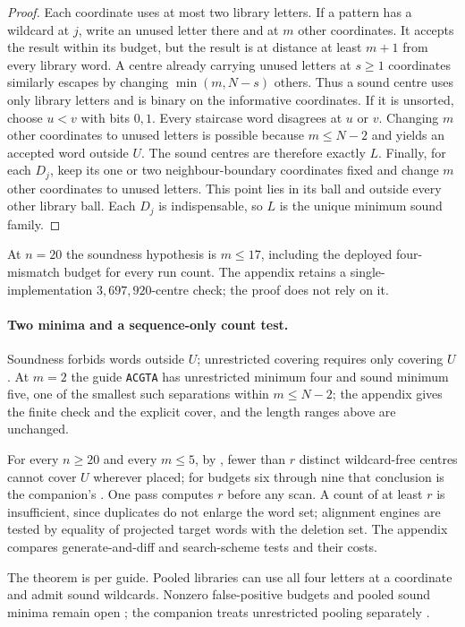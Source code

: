 \begin{proof}
Each coordinate uses at most two library letters. If a pattern has a wildcard at $j$, write an
unused letter there and at $m$ other coordinates. It accepts the result within its budget,
but the result is at distance at least $m+1$ from every library word. A centre already carrying
unused letters at $s\ge1$ coordinates similarly escapes by changing $\min(m,N-s)$ others.
Thus a sound centre uses only library letters and is binary on the informative coordinates.
If it is unsorted, choose $u<v$ with bits $0,1$. Every staircase word disagrees at $u$ or $v$.
Changing $m$ other coordinates to unused letters is possible because $m\le N-2$ and yields
an accepted word outside $U$. The sound centres are therefore exactly $L$.
Finally, for each $D_j$, keep its one or two neighbour-boundary coordinates fixed and change
$m$ other coordinates to unused letters. This point lies in its ball and outside every other
library ball. Each $D_j$ is indispensable, so $L$ is the unique minimum sound family.
\end{proof}
At $n=20$ the soundness hypothesis is $m\le17$, including the deployed
four-mismatch budget for every run count.
The appendix retains a single-implementation $3{,}697{,}920$-centre check; the proof does not rely on it.
\paragraph{Two minima and a sequence-only count test.}
Soundness forbids words outside $U$; unrestricted covering requires only covering $U$. At
$m=2$ the guide \texttt{ACGTA} has unrestricted minimum four and sound minimum five, one of
the smallest such separations within $m\le N-2$; the appendix gives the finite check and the
explicit cover, and the length ranges above are unchanged.

For every $n\ge20$ and every $m\le5$, by , fewer than $r$ distinct
wildcard-free centres cannot cover $U$ wherever placed; for budgets six through nine that
conclusion is the companion's \citep{companion_reach}. One pass computes $r$ before any scan. A count of at least $r$ is
insufficient, since duplicates do not enlarge the word set; alignment engines are tested by
equality of projected target words with the deletion set. The appendix compares generate-and-diff and
search-scheme tests and their costs.

The theorem is per guide. Pooled libraries can use all four letters at a coordinate
and admit sound wildcards. Nonzero false-positive budgets and pooled sound minima
remain open \citep{kucherov2005multiseed,renders2024lossless,gottlieb2025search};
the companion treats unrestricted pooling separately \citep{companion_reach}.

